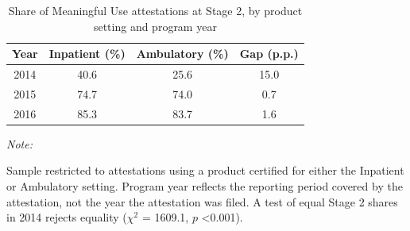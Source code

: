 \begin{table}[!h]
\centering
\caption{\label{tab:mu_stage2}Share of Meaningful Use attestations at Stage 2, by product setting and program year}
\centering
\begin{threeparttable}
\begin{tabular}[t]{cccc}
\toprule
Year & Inpatient (\%) & Ambulatory (\%) & Gap (p.p.)\\
\midrule
2014 & 40.6 & 25.6 & 15.0\\
2015 & 74.7 & 74.0 & 0.7\\
2016 & 85.3 & 83.7 & 1.6\\
\bottomrule
\end{tabular}
\begin{tablenotes}
\item \textit{Note: } 
\item Sample restricted to attestations using a product certified for either the Inpatient or Ambulatory setting. Program year reflects the reporting period covered by the attestation, not the year the attestation was filed. A test of equal Stage 2 shares in 2014 rejects equality ($\chi^2$ = 1609.1, $p$ <0.001).
\end{tablenotes}
\end{threeparttable}
\end{table}
